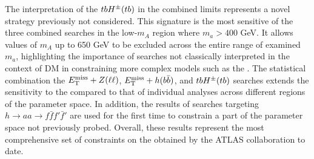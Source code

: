 The interpretation of the $tbH^{\pm}(tb)$ in the combined limits represents a novel strategy previously not considered. This signature is the most sensitive of the three combined searches in the low-$m_A$ region where $m_a>400$ GeV. It allows values of $m_A$ up to 650 GeV to be excluded across the entire range of examined $m_a$, highlighting the importance of searches not classically interpreted in the context of DM in constraining more complex models such as the \hdma. The statistical combination the $E_{\mathrm{T}}^{\mathrm{miss}}+Z(\ell\ell)$, $E_{\mathrm{T}}^{\mathrm{miss}}+h(b\bar{b})$, and $tbH^{\pm}(tb)$ searches extends the sensitivity to the \thdma compared to that of individual analyses across different regions of the parameter space. In addition, the results of searches targeting $h\rightarrow aa \rightarrow f\bar{f} f'\bar{f}'$ are used for the first time to constrain a part of the parameter space not previously probed. Overall, these results represent the most comprehensive set of constraints on the \thdma obtained by the ATLAS collaboration to date.

